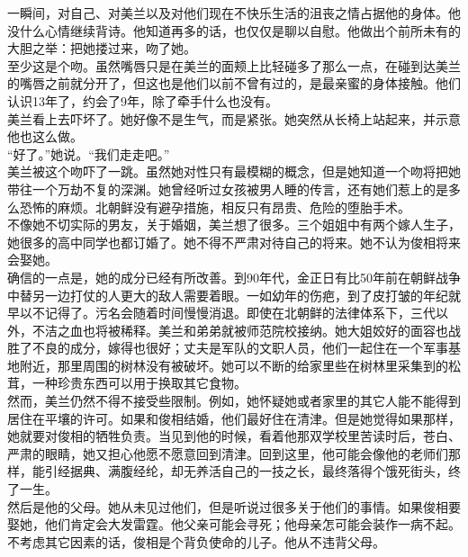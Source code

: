 一瞬间，对自己、对美兰以及对他们现在不快乐生活的沮丧之情占据他的身体。他没什么心情继续背诗。他知道再多的话，也仅仅是聊以自慰。他做出个前所未有的大胆之举：把她搂过来，吻了她。\\

至少这是个吻。虽然嘴唇只是在美兰的面颊上比轻碰多了那么一点，在碰到达美兰的嘴唇之前就分开了，但这也是他们以前不曾有过的，是最亲蜜的身体接触。他们认识13年了，约会了9年，除了牵手什么也没有。\\

美兰看上去吓坏了。她好像不是生气，而是紧张。她突然从长椅上站起来，并示意他也这么做。\\

“好了。”她说。“我们走走吧。”\\

美兰被这个吻吓了一跳。虽然她对性只有最模糊的概念，但是她知道一个吻将把她带往一个万劫不复的深渊。她曾经听过女孩被男人睡的传言，还有她们惹上的是多么恐怖的麻烦。北朝鲜没有避孕措施，相反只有昂贵、危险的堕胎手术。\\

不像她不切实际的男友，关于婚姻，美兰想了很多。三个姐姐中有两个嫁人生子，她很多的高中同学也都订婚了。她不得不严肃对待自己的将来。她不认为俊相将来会娶她。\\

确信的一点是，她的成分已经有所改善。到90年代，金正日有比50年前在朝鲜战争中替另一边打仗的人更大的敌人需要着眼。一如幼年的伤疤，到了皮打皱的年纪就早以不记得了。污名会随着时间慢慢消退。即使在北朝鲜的法律体系下，三代以外，不洁之血也将被稀释。美兰和弟弟就被师范院校接纳。她大姐姣好的面容也战胜了不良的成分，嫁得也很好；丈夫是军队的文职人员，他们一起住在一个军事基地附近，那里周围的树林没有被破坏。她可以不断的给家里些在树林里采集到的松茸，一种珍贵东西可以用于换取其它食物。\\

然而，美兰仍然不得不接受些限制。例如，她怀疑她或者家里的其它人能不能得到居住在平壤的许可。如果和俊相结婚，他们最好住在清津。但是她觉得如果那样，她就要对俊相的牺牲负责。当见到他的时候，看着他那双学校里苦读时后，苍白、严肃的眼睛，她又担心他愿不愿意回到清津。回到这里，他可能会像他的老师们那样，能引经据典、满腹经纶，却无养活自己的一技之长，最终落得个饿死街头，终了一生。\\

然后是他的父母。她从未见过他们，但是听说过很多关于他们的事情。如果俊相要娶她，他们肯定会大发雷霆。他父亲可能会寻死；他母亲怎可能会装作一病不起。不考虑其它因素的话，俊相是个背负使命的儿子。他从不违背父母。\\

